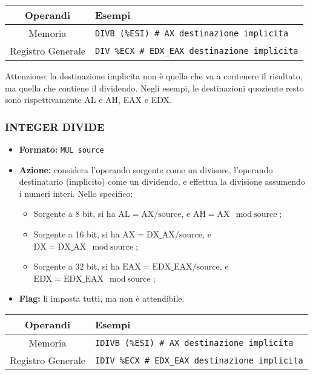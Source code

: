 \documentclass[a4paper,11pt]{article}
\begin{document}
		\begin{table}[H]
		\center {}
			\begin{tabular} { c | p{10cm} }
				\bfseries Operandi & \bfseries Esempi \\
				\hline
				Memoria & \texttt{DIVB (\%ESI)	\# AX destinazione implicita} \\ 
				Registro Generale & \texttt{DIV \%ECX	\# EDX\_EAX destinazione implicita}
			\end{tabular}
		\end{table}

Attenzione: la destinazione implicita non è quella che va a contenere il risultato, ma quella che contiene il dividendo.
Negli esempi, le destinazioni quoziente resto sono rispettivamente AL e AH, EAX e EDX.

\subsubsection{INTEGER DIVIDE}
\begin{itemize}
	\item \textbf{Formato:} \texttt{MUL source}
	\item \textbf{Azione:} considera l'operando sorgente come un divisore, l'operando destinatario (implicito) come un dividendo, e effettua la divisione assumendo i numeri interi. Nello specifico:
	\begin{itemize}
	\item Sorgente a 8 bit, si ha $\text{AL} = \text{AX} / \text{source}$, e $ \text{AH} = \text{AX} \mod \text{source} $;
	\item Sorgente a 16 bit, si ha $\text{AX} = \text{DX\_AX} / \text{source}$, e $ \text{DX} = \text{DX\_AX} \mod \text{source} $;
	\item Sorgente a 32 bit, si ha $\text{EAX} = \text{EDX\_EAX} / \text{source}$, e $ \text{EDX} = \text{EDX\_EAX} \mod \text{source} $;
	\end{itemize}
	\item \textbf{Flag:} li imposta tutti, ma non è attendibile.
\end{itemize}

		\begin{table}[H]
		\center {}
			\begin{tabular} { c | p{10cm} }
				\bfseries Operandi & \bfseries Esempi \\
				\hline
				Memoria & \texttt{IDIVB (\%ESI)	\# AX destinazione implicita} \\ 
				Registro Generale & \texttt{IDIV \%ECX	\# EDX\_EAX destinazione implicita}
			\end{tabular}
		\end{table}
\end{document}
